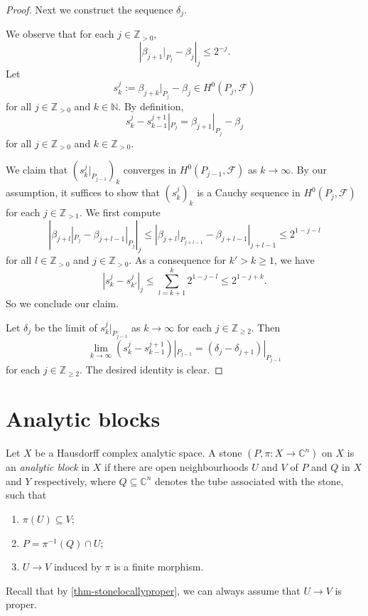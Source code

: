 \begin{proof}
    Next we construct the sequence $\delta_j$.

    We observe that for each $j\in \mathbb{Z}_{>0}$,
    \[
        \left|\beta_{j+1}|_{P_j}-\beta_j  \right|_j\leq 2^{-j}.
    \]
    Let
    \[
        s^j_{k}:=\beta_{j+k}|_{P_j}-\beta_j  \in H^0(P_j,\mathcal{F})
    \]
    for all $j\in \mathbb{Z}_{>0}$ and $k\in \mathbb{N}$.
    By definition,
    \[
        s^j_k-s^{j+1}_{k-1}|_{P_j}  =\beta_{j+1}|_{P_j}-\beta_j
    \]
    for all $j\in \mathbb{Z}_{>0}$ and $k\in \mathbb{Z}_{>0}$.

    We claim that $(s^j_k|_{P_{j-1}})_k$ converges in $H^0(P_{j-1},\mathcal{F})$ as $k\to\infty$. 
    By our assumption, it suffices to show that $(s^j_k)_k$ is a Cauchy sequence in $H^0(P_j,\mathcal{F})$ for each $j\in \mathbb{Z}_{>1}$.
    We first compute
    \[
        \left|\beta_{j+l}|_{P_j}-\beta_{j+l-1}|_{P_j}\right|_j\leq   \left|\beta_{j+l}|_{P_{j+l-1}}-\beta_{j+l-1}\right|_{j+l-1}\leq 2^{1-j-l}
    \]
    for all $l\in \mathbb{Z}_{>0}$ and $j\in \mathbb{Z}_{>0}$. As a consequence for $k'>k\geq 1$, we have
    \[
        |s^j_k-s^j_{k'}|_j\leq \sum_{l=k+1}^k 2^{1-j-l}\leq 2^{1-j+k}.  
    \]
    So we conclude our claim.

    Let $\delta_j$ be the limit of $s^j_k|_{P_{j-1}}$ as $k\to\infty$ for each $j\in \mathbb{Z}_{\geq 2}$. 
    Then
    \[
        \lim_{k\to\infty}\left(s^j_k-s^{j+1}_{k-1}\right)|_{P_{j-1}}=\left(\delta_j-\delta_{j+1}\right)|_{P_{j-1}}  
    \]
    for each $j\in \mathbb{Z}_{\geq 2}$.
    The desired identity is clear.
\end{proof}


\section{Analytic blocks}

\begin{definition}\label{def-anablock}
    Let $X$ be a Hausdorff complex analytic space. A stone $(P,\pi:X\rightarrow \mathbb{C}^n)$ on $X$ is an \emph{analytic block} in $X$ if there are open neighbourhoods $U$ and $V$ of $P$ and $Q$ in $X$ and $Y$ respectively, where $Q\subseteq \mathbb{C}^n$ denotes the tube associated with the stone, such that
    \begin{enumerate}
        \item $\pi(U)\subseteq V$;
        \item $P=\pi^{-1}(Q)\cap U$;
        \item $U\rightarrow V$ induced by $\pi$ is a finite morphism.
    \end{enumerate}
\end{definition}
Recall that by \cref{thm-stonelocallyproper}, we can always assume that $U\rightarrow V$ is proper.

